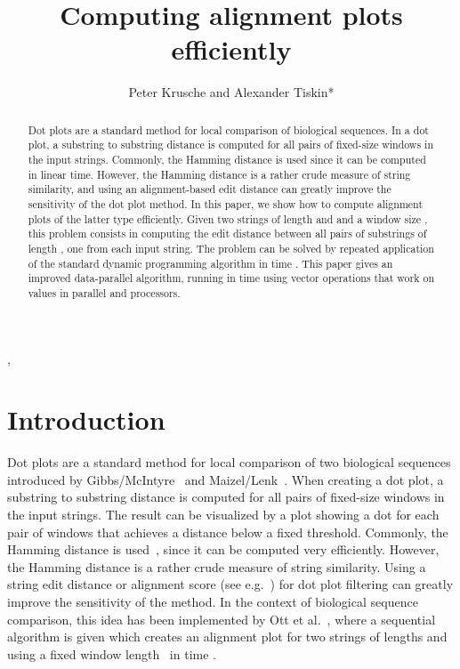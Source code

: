 \documentclass{IOS-Book-Article}     \usepackage{amsmath}
\theoremstyle{plain}
\theoremstyle{definition}
\begin{document}
\begin{frontmatter}          \title{Computing alignment plots efficiently}


\author{Peter Krusche and Alexander Tiskin*},
\address{Dept. of Computer Science, University of Warwick, Coventry,
CV4~7AL, UK}
\begin{abstract}
Dot plots are a standard method for local comparison of biological
sequences. In a dot plot, a substring to substring distance is computed for all
pairs of fixed-size windows in the input strings. Commonly, the Hamming distance
is used since it can be computed in linear time. However, the Hamming distance
is a rather crude measure of string similarity, and using an alignment-based edit
distance can greatly improve the sensitivity of the dot plot method.
In this paper, we show how to compute alignment plots of the latter type
efficiently. Given two strings of length  and  and a window size , this
problem consists in computing the edit distance between all pairs of
substrings of length , one from each input string. The problem can be
solved by repeated application of the standard dynamic programming
algorithm in time . This paper gives an improved
data-parallel algorithm, running in time  using vector
operations that work on  values in parallel and  processors.
\end{abstract}



\end{frontmatter}



\section{Introduction}

\let\thefootnote\relax{}
Dot plots are a standard method for local comparison of two biological
sequences introduced by Gibbs/McIntyre~\cite{Gibbs:70} and
Maizel/Lenk~\cite{Maizel_Lenk:81}.
When creating a dot plot, a substring to substring distance is computed
for all pairs of fixed-size windows in the input strings. The result
can be visualized by a plot showing a dot for each pair of windows that
achieves a distance below a fixed threshold.
Commonly, the Hamming distance is used~\cite{Maizel_Lenk:81,Krumsiek:07}, since it can be
computed very efficiently. 
However, the Hamming distance is a rather crude measure of string similarity.
Using a string edit distance or alignment score (see e.g.\ \cite{Gusfield:97})
for dot plot filtering can greatly improve the sensitivity of the method.
In the context of biological sequence comparison, this idea has been implemented
by Ott et al.~\cite{Ott:09}, where a sequential algorithm is given which
creates an alignment plot for two strings of lengths  and  using a 
fixed window length~ in time . 
\end{document}
